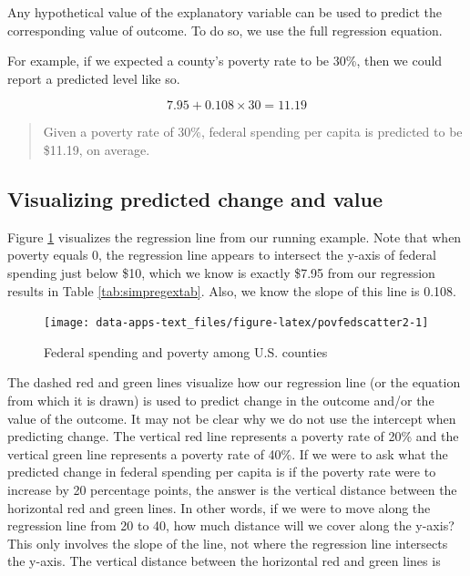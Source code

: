 \documentclass[
]{book}
\begin{document}
Any hypothetical value of the explanatory variable can be used to predict the corresponding value of outcome. To do so, we use the full regression equation.

For example, if we expected a county's poverty rate to be 30\%, then we could report a predicted level like so.

\[7.95 + 0.108 \times 30 = 11.19\]

\begin{quote}
Given a poverty rate of 30\%, federal spending per capita is predicted to be \$11.19, on average.
\end{quote}

\hypertarget{visualizing-predicted-change-and-value}{%
\subsection{Visualizing predicted change and value}\label{visualizing-predicted-change-and-value}}

Figure \ref{fig:povfedscatter2} visualizes the regression line from our running example. Note that when poverty equals 0, the regression line appears to intersect the y-axis of federal spending just below \$10, which we know is exactly \$7.95 from our regression results in Table \ref{tab:simpregextab}. Also, we know the slope of this line is 0.108.

\begin{figure}

{\centering \texttt{[image: data-apps-text\_files/figure-latex/povfedscatter2-1]} 

}

\caption{Federal spending and poverty among U.S. counties}\label{fig:povfedscatter2}
\end{figure}

The dashed red and green lines visualize how our regression line (or the equation from which it is drawn) is used to predict change in the outcome and/or the value of the outcome. It may not be clear why we do not use the intercept when predicting change. The vertical red line represents a poverty rate of 20\% and the vertical green line represents a poverty rate of 40\%. If we were to ask what the predicted change in federal spending per capita is if the poverty rate were to increase by 20 percentage points, the answer is the vertical distance between the horizontal red and green lines. In other words, if we were to move along the regression line from 20 to 40, how much distance will we cover along the y-axis? This only involves the slope of the line, not where the regression line intersects the y-axis. The vertical distance between the horizontal red and green lines is
\end{document}
